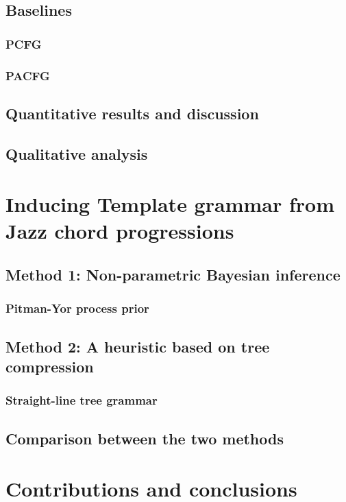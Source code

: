     \section{Baselines}
        \subsection{PCFG}
        \subsection{PACFG}
    \section{Quantitative results and discussion}
    \section{Qualitative analysis}
\chapter{Inducing Template grammar from Jazz chord progressions}
    \section{Method 1: Non-parametric Bayesian inference}
        \subsection{Pitman-Yor process prior}
    \section{Method 2: A heuristic based on tree compression} 
        \subsection{Straight-line tree grammar}
    \section{Comparison between the two methods}
   
\chapter{Contributions and conclusions}

\cleardoublepage
{}

% 
% 
% 



